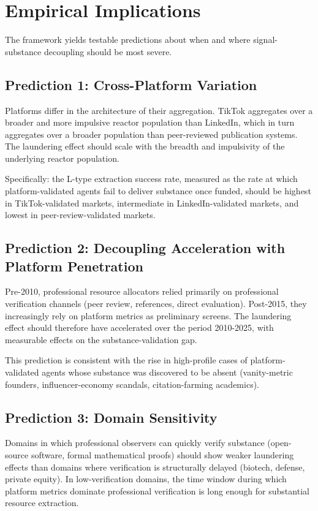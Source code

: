 \documentclass[11pt]{article}
\begin{document}
\section{Empirical Implications}

The framework yields testable predictions about when and where signal-substance decoupling should be most severe.

\subsection{Prediction 1: Cross-Platform Variation}

Platforms differ in the architecture of their aggregation. TikTok aggregates over a broader and more impulsive reactor population than LinkedIn, which in turn aggregates over a broader population than peer-reviewed publication systems. The laundering effect should scale with the breadth and impulsivity of the underlying reactor population.

Specifically: the L-type extraction success rate, measured as the rate at which platform-validated agents fail to deliver substance once funded, should be highest in TikTok-validated markets, intermediate in LinkedIn-validated markets, and lowest in peer-review-validated markets.

\subsection{Prediction 2: Decoupling Acceleration with Platform Penetration}

Pre-2010, professional resource allocators relied primarily on professional verification channels (peer review, references, direct evaluation). Post-2015, they increasingly rely on platform metrics as preliminary screens. The laundering effect should therefore have accelerated over the period 2010-2025, with measurable effects on the substance-validation gap.

This prediction is consistent with the rise in high-profile cases of platform-validated agents whose substance was discovered to be absent (vanity-metric founders, influencer-economy scandals, citation-farming academics).

\subsection{Prediction 3: Domain Sensitivity}

Domains in which professional observers can quickly verify substance (open-source software, formal mathematical proofs) should show weaker laundering effects than domains where verification is structurally delayed (biotech, defense, private equity). In low-verification domains, the time window during which platform metrics dominate professional verification is long enough for substantial resource extraction.
\end{document}
